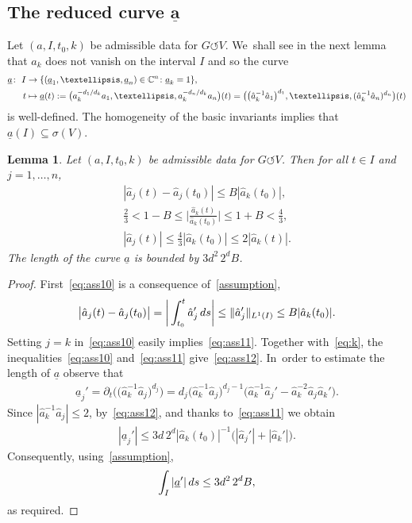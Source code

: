 \documentclass[11pt]{article}
\numberwithin{equation}{section}
\numberwithin{equation}{section}
\newtheorem{Lemma}[Theorem]{Lemma}
\def\si{\sigma}
\def\C{\mathbb{C}}
\def\p{\partial}
\def\ul{\underline}
\def\we{\hat}
\def\acts{\circlearrowleft}
\begin{document}
\subsection[The reduced curve a]{The reduced curve $\boldsymbol{\ul a}$}

Let $(a, I, t_0, k)$ be admissible data for $G \acts V$. We~shall see in the next lemma that
$a_k$ does not vanish on the interval $I$ and so the curve
\begin{align}
 \underline a \colon\ I &\to \{(\underline a_1,\dots,\underline a_n) \in \C^{n} \colon \underline a_k=1\}, \notag
 \\
 t &\mapsto \ul a(t) := \big( a_k^{-d_1/d_k} a_1, \dots, a_k^{-d_n/d_k} a_n\big)(t)
 = \big( \big(\we a_k^{-1} \we a_1\big)^{d_1}, \dots, (\we a_k^{-1} \we a_n)^{d_n}\big)(t)
 \label{curve}
\end{align}
is well-defined. The homogeneity of the basic invariants implies that $\ul a(I) \subseteq \si(V)$.

\begin{Lemma} \label{lem1}
 Let $(a, I, t_0, k)$ be admissible data for $G \acts V$.
 Then for all $t \in I$ and $j=1,\dots,n$,
 \begin{gather} \label{eq:ass10}
 |\we a_j (t) - \we a_j (t_0)| \le B |\we a_k (t_0)|,
 \\[1ex]
 \frac 2 3 < 1-B \le \bigg | \frac{\we a_k(t)}{\we a_k(t_0)} \bigg | \le 1+B < \frac4 3,\label{eq:ass11}
 \\[1ex]
 |\we a_j(t)| \le \frac 4 3 |\we a_k(t_0)| \le 2 |\we a_k(t)|.\label{eq:ass12}
 \end{gather}
 The length of the curve $\ul a$
 is bounded by $3 d^2\, 2^{d} B$.
\end{Lemma}

\begin{proof}
 First~\eqref{eq:ass10} is a consequence of~\eqref{assumption},
 \begin{gather*}
 \big|\we a_j (t) - \we a_j (t_0)\big| = \bigg|\int_{t_0}^t \we a_j' \,{\rm d}s\bigg|
 \le \| \we a_j'\|_{L^1(I)} \le B |\we a_k(t_0)|.
 \end{gather*}
 Setting $j=k$ in~\eqref{eq:ass10} easily implies~\eqref{eq:ass11}. Together with~\eqref{eq:k}, the inequalities~\eqref{eq:ass10} and~\eqref{eq:ass11} give~\eqref{eq:ass12}. In~order to estimate the length of $\ul a$ observe that
 \begin{gather*}
 \ul a_j' = \p_t \big(\big(\we a_k^{-1} \we a_j\big)^{d_j} \big) = d_j \big(\we a_k^{-1} \we a_j\big)^{d_j-1} \big(\we a_k^{-1} \we a_j'
 - \we a_k^{-2} \we a_j \we a_k' \big).
 \end{gather*}
 Since $|\we a_k^{-1} \we a_j| \le 2$, by~\eqref{eq:ass12}, and thanks to~\eqref{eq:ass11} we obtain
 \begin{gather*}
 |\ul a_j'| \le 3 d\, 2^{d} |\we a_k(t_0)|^{-1} \big( |\we a_j'| + |\we a_k'|\big).
 \end{gather*}
 Consequently, using~\eqref{assumption},
 \begin{gather*}
 \int_I |\ul a'| \,{\rm d}s \le 3 d^2\, 2^{d} B,
 \end{gather*}
 as required.
\end{proof}
\end{document}
